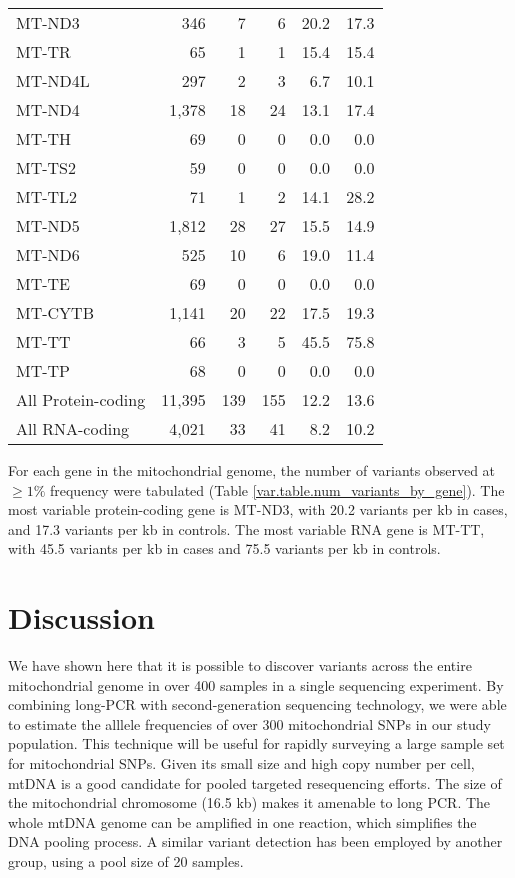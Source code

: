 \begin{table}[htbp]
\begin{minipage}{\textwidth}
{\begin{tabular}{l r r r r r}
MT-ND3   &   346 &  7 &  6 & 20.2 & 17.3 \\ 
MT-TR    &    65 &  1 &  1 & 15.4 & 15.4 \\ 
MT-ND4L  &   297 &  2 &  3 &  6.7 & 10.1 \\ 
MT-ND4   & 1,378 & 18 & 24 & 13.1 & 17.4 \\ 
MT-TH    &    69 &  0 &  0 &  0.0 &  0.0 \\ 
MT-TS2   &    59 &  0 &  0 &  0.0 &  0.0 \\ 
MT-TL2   &    71 &  1 &  2 & 14.1 & 28.2 \\ 
MT-ND5   & 1,812 & 28 & 27 & 15.5 & 14.9 \\ 
MT-ND6   &   525 & 10 &  6 & 19.0 & 11.4 \\ 
MT-TE    &    69 &  0 &  0 &  0.0 &  0.0 \\ 
MT-CYTB  & 1,141 & 20 & 22 & 17.5 & 19.3 \\ 
MT-TT    &    66 &  3 &  5 & 45.5 & 75.8 \\ 
MT-TP    &    68 &  0 &  0 &  0.0 &  0.0 \\ \hline
All Protein-coding & 11,395 & 139 & 155 & 12.2 & 13.6 \\ 
All RNA-coding     &  4,021 &  33 &  41 &  8.2 & 10.2 \\  
\end{tabular}}
\end{minipage}
\end{table}

For each gene in the mitochondrial genome, the number of variants observed at $\geq 1\%$ frequency were tabulated (Table \ref{var.table.num_variants_by_gene}). The most variable protein-coding gene is MT-ND3, with 20.2 variants per \ac{kb} in cases, and 17.3 variants per \ac{kb} in controls.  The most variable RNA gene is MT-TT, with 45.5 variants per \ac{kb} in cases and 75.5 variants per \ac{kb} in controls.

\section{Discussion}
We have shown here that it is possible to discover variants across the entire mitochondrial genome in over 400 samples in a single sequencing experiment. By combining long-PCR with second-generation sequencing technology, we were able to estimate the alllele frequencies of over 300 mitochondrial SNPs in our study population. This technique will be useful for rapidly surveying a large sample set for mitochondrial SNPs. Given its small size and high copy number per cell, mtDNA is a good candidate for pooled targeted resequencing efforts. The size of the mitochondrial chromosome (16.5 \ac{kb}) makes it amenable to long PCR. The whole mtDNA genome can be amplified in one reaction, which simplifies the DNA pooling process.  A similar variant detection has been employed by another group, using a pool size of 20 samples\cite{wang2011estimating}.

